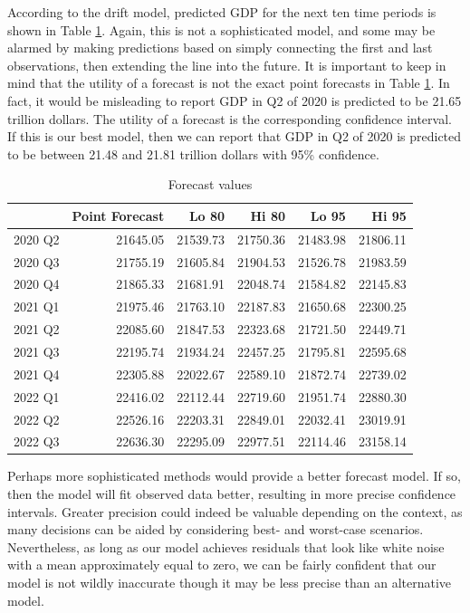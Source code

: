 \documentclass[
]{book}
\begin{document}
According to the drift model, predicted GDP for the next ten time periods is shown in Table \ref{tab:gdpdrift}. Again, this is not a sophisticated model, and some may be alarmed by making predictions based on simply connecting the first and last observations, then extending the line into the future. It is important to keep in mind that the utility of a forecast is not the exact point forecasts in Table \ref{tab:gdpdrift}. In fact, it would be misleading to report GDP in Q2 of 2020 is predicted to be 21.65 trillion dollars. The utility of a forecast is the corresponding confidence interval. If this is our best model, then we can report that GDP in Q2 of 2020 is predicted to be between 21.48 and 21.81 trillion dollars with 95\% confidence.

\begin{table}

\caption{\label{tab:gdpdrift}Forecast values}
\centering
\begin{tabular}[t]{l|r|r|r|r|r}
\hline
  & Point Forecast & Lo 80 & Hi 80 & Lo 95 & Hi 95\\
\hline
2020 Q2 & 21645.05 & 21539.73 & 21750.36 & 21483.98 & 21806.11\\
\hline
2020 Q3 & 21755.19 & 21605.84 & 21904.53 & 21526.78 & 21983.59\\
\hline
2020 Q4 & 21865.33 & 21681.91 & 22048.74 & 21584.82 & 22145.83\\
\hline
2021 Q1 & 21975.46 & 21763.10 & 22187.83 & 21650.68 & 22300.25\\
\hline
2021 Q2 & 22085.60 & 21847.53 & 22323.68 & 21721.50 & 22449.71\\
\hline
2021 Q3 & 22195.74 & 21934.24 & 22457.25 & 21795.81 & 22595.68\\
\hline
2021 Q4 & 22305.88 & 22022.67 & 22589.10 & 21872.74 & 22739.02\\
\hline
2022 Q1 & 22416.02 & 22112.44 & 22719.60 & 21951.74 & 22880.30\\
\hline
2022 Q2 & 22526.16 & 22203.31 & 22849.01 & 22032.41 & 23019.91\\
\hline
2022 Q3 & 22636.30 & 22295.09 & 22977.51 & 22114.46 & 23158.14\\
\hline
\end{tabular}
\end{table}

Perhaps more sophisticated methods would provide a better forecast model. If so, then the model will fit observed data better, resulting in more precise confidence intervals. Greater precision could indeed be valuable depending on the context, as many decisions can be aided by considering best- and worst-case scenarios. Nevertheless, as long as our model achieves residuals that look like white noise with a mean approximately equal to zero, we can be fairly confident that our model is not wildly inaccurate though it may be less precise than an alternative model.
\end{document}
